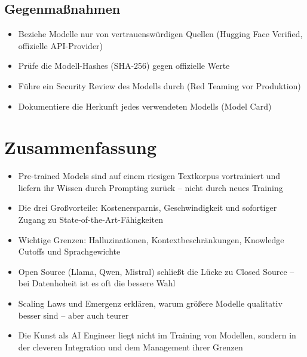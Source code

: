 \subsection{Gegenmaßnahmen}

\begin{itemize}[leftmargin=*]
    \item Beziehe Modelle nur von vertrauenswürdigen Quellen (Hugging Face Verified, offizielle API-Provider)
    \item Prüfe die Modell-Hashes (SHA-256) gegen offizielle Werte
    \item Führe ein Security Review des Modells durch (Red Teaming vor Produktion)
    \item Dokumentiere die Herkunft jedes verwendeten Modells (Model Card)
\end{itemize}

\section{Zusammenfassung}

\begin{itemize}[leftmargin=*]
    \item Pre-trained Models sind auf einem riesigen Textkorpus vortrainiert und liefern ihr Wissen durch Prompting zurück -- nicht durch neues Training
    \item Die drei Großvorteile: Kostenersparnis, Geschwindigkeit und sofortiger Zugang zu State-of-the-Art-Fähigkeiten
    \item Wichtige Grenzen: Halluzinationen, Kontextbeschränkungen, Knowledge Cutoffs und Sprachgewichte
    \item Open Source (Llama, Qwen, Mistral) schließt die Lücke zu Closed Source -- bei Datenhoheit ist es oft die bessere Wahl
    \item Scaling Laws und Emergenz erklären, warum größere Modelle qualitativ besser sind -- aber auch teurer
    \item Die Kunst als AI Engineer liegt nicht im Training von Modellen, sondern in der cleveren Integration und dem Management ihrer Grenzen
\end{itemize}




